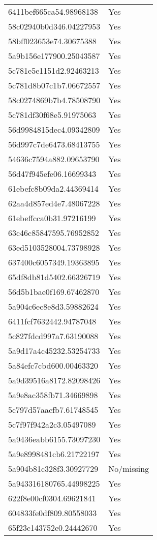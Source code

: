 \begin{tabular}{ll}
6411bef665ca54.98968138 & Yes \\
58c02940b0d346.04227953 & Yes \\
58bff023653e74.30675388 & Yes \\
5a9b156e177900.25043587 & Yes \\
5c781e5e1151d2.92463213 & Yes \\
5c781d8b07c1b7.06672557 & Yes \\
58c0274869b7b4.78508790 & Yes \\
5c781df30f68e5.91975063 & Yes \\
56d9984815dec4.09342809 & Yes \\
56d997c7de6473.68413755 & Yes \\
54636c7594a882.09653790 & Yes \\
56d47f945efe06.16699343 & Yes \\
61ebefc8b09da2.44369414 & Yes \\
62aa4d857ed4e7.48067228 & Yes \\
61ebeffcca0b31.97216199 & Yes \\
63c46c85847595.76952852 & Yes \\
63ed5103528004.73798928 & Yes \\
637400c6057349.19363895 & Yes \\
65df8db81d5402.66326719 & Yes \\
56d5b1bae0f169.67462870 & Yes \\
5a904c6ec8e8d3.59882624 & Yes \\
6411fcf7632442.94787048 & Yes \\
5c827fdcd997a7.63190088 & Yes \\
5a9d17a4c45232.53254733 & Yes \\
5a84efc7cbd600.00463320 & Yes \\
5a9d39516a8172.82098426 & Yes \\
5a9e8ac358fb71.34669898 & Yes \\
5c797d57aacfb7.61748545 & Yes \\
5c7f97f942a2c3.05497089 & Yes \\
5a9436eabb6155.73097230 & Yes \\
5a9e8998481cb6.21722197 & Yes \\
5a904b81c328f3.30927729 & No/missing \\
5a943316180765.44998225 & Yes \\
622f8e00cf0304.69621841 & Yes \\
604833fe0df809.80558033 & Yes \\
65f23c143752e0.24442670 & Yes \\

\end{tabular}
